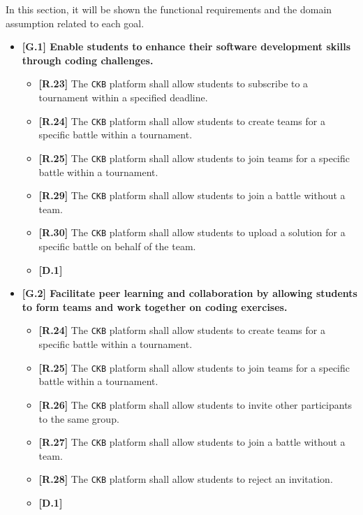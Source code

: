 In this section, it will be shown the functional requirements and the domain assumption related to each goal.
\begin{itemize}

    \item \textbf{{[G.1]} Enable students to enhance their software development skills through coding challenges.}
    \begin{itemize}
        \item \textbf{[R.23]} The \verb|CKB| platform shall allow students to subscribe to a tournament within a specified deadline.
        \item \textbf{[R.24]} The \verb|CKB| platform shall allow students to create teams for a specific battle within a tournament.
        \item \textbf{[R.25]} The \verb|CKB| platform shall allow students to join teams for a specific battle within a tournament. 
        \item \textbf{[R.29]} The \verb|CKB| platform shall allow students to join a battle without a team. 
        \item \textbf{[R.30]} The \verb|CKB| platform shall allow students to upload a solution for a specific battle on behalf of the team.
        \item \textbf{[D.1]}
    \end{itemize}

    \item \textbf{{[G.2]} Facilitate peer learning and collaboration by allowing students to form teams and work together on coding exercises. }
        \begin{itemize}
            \item \textbf{[R.24]} The \verb|CKB| platform shall allow students to create teams for a specific battle within a tournament.
            \item \textbf{[R.25]} The \verb|CKB| platform shall allow students to join teams for a specific battle within a tournament.
            \item \textbf{[R.26]} The \verb|CKB| platform shall allow students to invite other participants to the same group. 
            \item \textbf{[R.27]} The \verb|CKB| platform shall allow students to join a battle without a team.
            \item \textbf{[R.28]} The \verb|CKB| platform shall allow students to reject an invitation.
            \item \textbf{[D.1]}
        \end{itemize}


\end{itemize}

